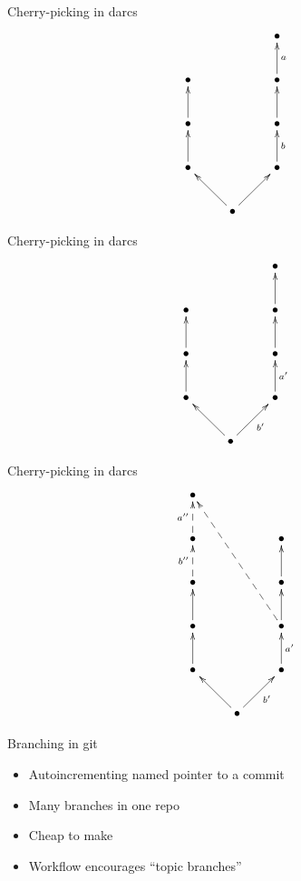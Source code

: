 \documentclass[pdf]{prosper}
\begin{document}


\begin{slide}{Cherry-picking in darcs}
\[
\xymatrix{
	&& \bullet \\
	\bullet && \bullet \ar[u]_a \\
	\bullet \ar[u] && \bullet \ar[u] \\
	\bullet \ar[u] && \bullet \ar[u]_b \\
	& \bullet \ar[ul] \ar[ur]
}
\]
\end{slide}

\begin{slide}{Cherry-picking in darcs}
\[
\xymatrix{
	&& \bullet \\
	\bullet && \bullet \ar[u] \\
	\bullet \ar[u] && \bullet \ar[u]_{} \\
	\bullet \ar[u] && \bullet \ar[u]_{a'} \\
	& \bullet \ar[ul] \ar[ur]_{b'}
}
\]
\end{slide}

\begin{slide}{Cherry-picking in darcs}
\[
\xymatrix{
	\bullet \\
	\bullet \ar@{-->}[u]^{a''} && \bullet \\
	\bullet \ar@{-->}[u]^{b''} && \bullet \ar[u] \\
	\bullet \ar[u] && \bullet \ar[u] \ar@{-->}[uuull] \\
	\bullet \ar[u] && \bullet \ar[u]_{a'} \\
	& \bullet \ar[ul] \ar[ur]_{b'}
}
\]
\end{slide}


\begin{slide}{Branching in git}
\begin{itemize}
\item Autoincrementing named pointer to a commit
\item Many branches in one repo
\item Cheap to make
\item Workflow encourages ``topic branches''
\end{itemize}
\end{slide}
\end{document}
